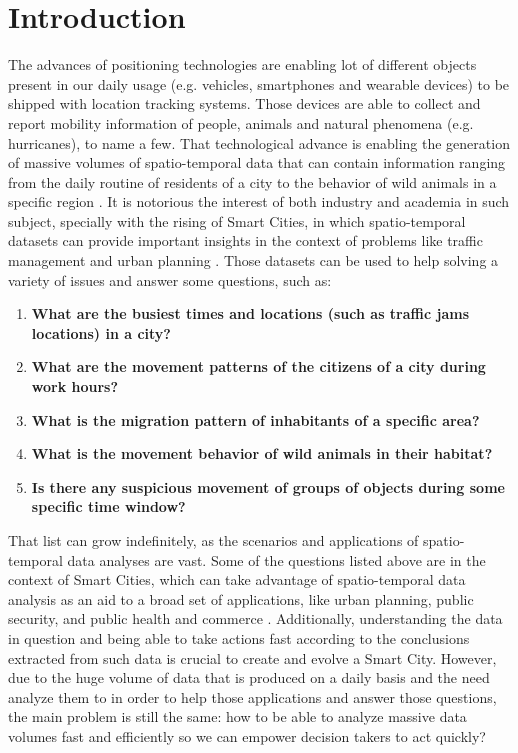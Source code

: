 \chapter{Introduction}
\label{chp:introduction}
The advances of positioning technologies are enabling lot of different objects present in our daily usage (e.g.
vehicles, smartphones and wearable devices) to be shipped with location tracking systems. Those devices are able to
collect and report mobility information of people, animals and natural phenomena (e.g. hurricanes), to name a few. That
technological advance is enabling the generation of massive volumes of spatio-temporal data that can contain information
ranging from the daily routine of residents of a city \cite{whatdidyoudo} to the behavior of wild animals in a specific
region \cite{trajclustering, miningperiodic}. It is notorious the interest of both industry and academia in such
subject, specially with the rising of Smart Cities, in which spatio-temporal datasets can provide important insights in
the context of problems like traffic management and urban planning \cite{gissmartcities, parallelsmartcities}. Those
datasets can be used to help solving a variety of issues and answer some questions, such as:

\begin{enumerate}
    \item \textbf{What are the busiest times and locations (such as traffic jams locations) in a city?}
        \cite{visualtrafficjam}
    \item \textbf{What are the movement patterns of the citizens of a city during work hours?}
    \item \textbf{What is the migration pattern of inhabitants of a specific area?}
    \item \textbf{What is the movement behavior of wild animals in their habitat?} \cite{movemine}
    \item \textbf{Is there any suspicious movement of groups of objects during some specific time window?}
\end{enumerate}

That list can grow indefinitely, as the scenarios and applications of spatio-temporal data analyses are vast. Some of
the questions listed above are in the context of Smart Cities, which can take advantage of spatio-temporal data analysis
as an aid to a broad set of applications, like urban planning, public security, and public health and commerce
\cite{ieeesmartcities}. Additionally, understanding the data in question and being able to take actions fast according
to the conclusions extracted from such data is crucial to create and evolve a Smart City. However, due to the huge
volume of data that is produced on a daily basis and the need analyze them to in order to help those applications and
answer those questions, the main problem is still the same: how to be able to analyze massive data volumes fast and
efficiently so we can empower decision takers to act quickly?

